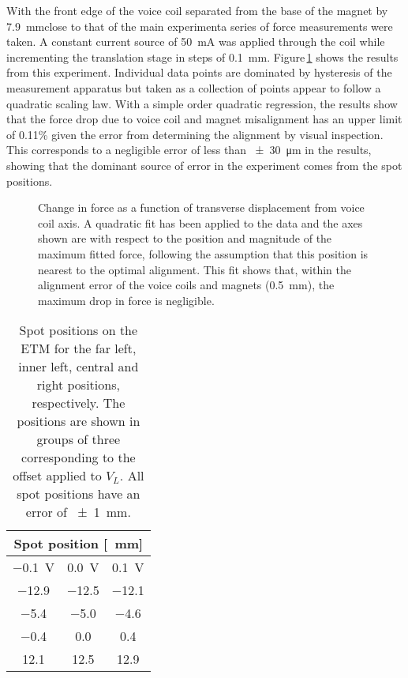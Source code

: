 With the front edge of the voice coil separated from the base of the magnet by \SI{7.9}{\milli\meter}\textemdash close to that of the main experiment\textemdash a series of force measurements were taken. A constant current source of \SI{50}{\milli\ampere} was applied through the coil while incrementing the translation stage in steps of \SI{0.1}{\milli\meter}. Figure\,\ref{fig:misaligned-voice-coil-results} shows the results from this experiment. Individual data points are dominated by hysteresis of the measurement apparatus but taken as a collection of points appear to follow a quadratic scaling law. With a simple  order quadratic regression, the results show that the force drop due to voice coil and magnet misalignment has an upper limit of \SI{0.11}{}\% given the error from determining the alignment by visual inspection. This corresponds to a negligible error of less than \SI{\pm30}{\micro\meter} in the results, showing that the dominant source of error in the experiment comes from the spot positions.

\begin{figure}
  \centering
  
  \caption[Change in force as a function of transverse displacement from voice coil axis]{\label{fig:misaligned-voice-coil-results}Change in force as a function of transverse displacement from voice coil axis. A quadratic fit has been applied to the data and the axes shown are with respect to the position and magnitude of the maximum fitted force, following the assumption that this position is nearest to the optimal alignment. This fit shows that, within the alignment error of the voice coils and magnets (\SI{0.5}{\milli\meter}), the maximum drop in force is negligible.}
\end{figure}

\begin{table}
  \centering
  \begin{tabular}{|c|c|c|}
    \hline
    \multicolumn{3}{|c|}{\textbf{Spot position [\SI{}{\milli \meter}]}} \\ \hline
    \SI{-0.1}{\volt} & \SI{0.0}{\volt} & \SI{+0.1}{\volt}               \\ \hline\hline
    \num{-12.9} & \num{-12.5} & \num{-12.1}                             \\ \hline
    \num{-5.4} & \num{-5.0} & \num{-4.6}                                \\ \hline
    \num{-0.4} & \num{0.0} & \num{0.4}                                  \\ \hline
    \num{12.1} & \num{12.5} & \num{12.9}                                \\ \hline
  \end{tabular}
  \caption[Spot positions on the end test mass]{\label{tab:spot-positions}Spot positions on the \gls{ETM} for the far left, inner left, central and right positions, respectively. The positions are shown in groups of three corresponding to the offset applied to $V_L$. All spot positions have an error of \SI{\pm1}{\milli\meter}.}
\end{table}

